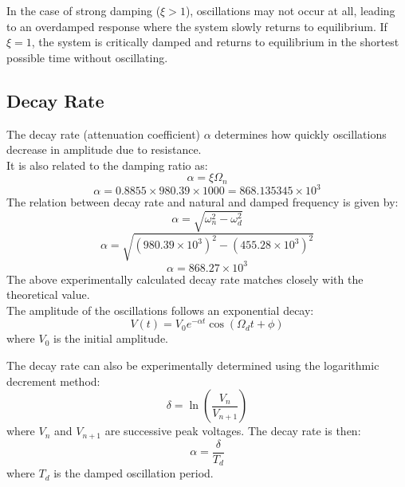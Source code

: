 \documentclass[a4paper,12pt]{article}
\begin{document}
In the case of strong damping (\(\xi > 1\)), oscillations may not occur at all, leading to an overdamped response where the system slowly returns to equilibrium. If \(\xi = 1\), the system is critically damped and returns to equilibrium in the shortest possible time without oscillating.
\subsection{Decay Rate}
The decay rate (attenuation coefficient) \(\alpha\) determines how quickly oscillations decrease in amplitude due to resistance.\\
It is also related to the damping ratio as:
\begin{equation*}
    \alpha = \xi \Omega_n
\end{equation*}
\begin{equation*}
    \alpha = 0.8855 \times 980.39 \times 1000 = 868.135345 \times 10^3
\end{equation*}
The relation between decay rate and natural and damped frequency is given by:
\begin{equation*}
    \alpha = \sqrt{\omega_n^2 - \omega_d^2}
\end{equation*}
\begin{equation*}
    \alpha = \sqrt{\left(980.39 \times 10^3\right)^2 - \left(455.28 \times 10^3\right)^2}
\end{equation*}
\begin{equation*}
    \alpha = 868.27 \times 10^3
\end{equation*}
The above experimentally calculated decay rate matches closely with the theoretical value.\\ 

The amplitude of the oscillations follows an exponential decay:
\begin{equation*}
    V(t) = V_0 e^{-\alpha t} \cos(\Omega_d t + \phi)
\end{equation*}
where \(V_0\) is the initial amplitude.

The decay rate can also be experimentally determined using the logarithmic decrement method:
\begin{equation*}
    \delta = \ln \left(\frac{V_n}{V_{n+1}}\right)
\end{equation*}
where \(V_n\) and \(V_{n+1}\) are successive peak voltages. The decay rate is then:
\begin{equation*}
    \alpha = \frac{\delta}{T_d}
\end{equation*}
where \(T_d\) is the damped oscillation period.
\end{document}
